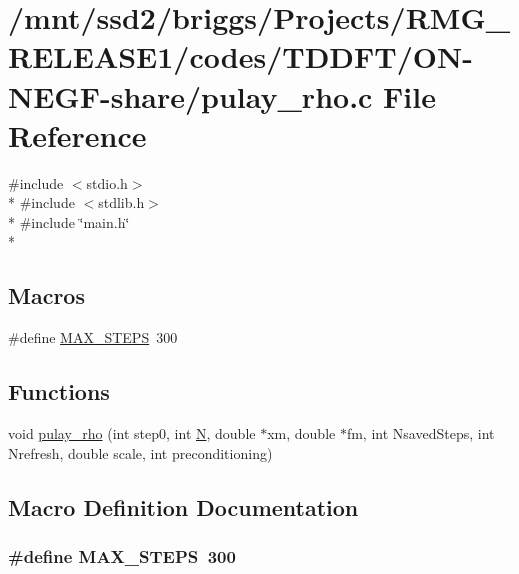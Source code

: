 \hypertarget{_t_d_d_f_t_2_o_n-_n_e_g_f-share_2pulay__rho_8c}{\section{/mnt/ssd2/briggs/\-Projects/\-R\-M\-G\-\_\-\-R\-E\-L\-E\-A\-S\-E1/codes/\-T\-D\-D\-F\-T/\-O\-N-\/\-N\-E\-G\-F-\/share/pulay\-\_\-rho.c File Reference}
\label{_t_d_d_f_t_2_o_n-_n_e_g_f-share_2pulay__rho_8c}
}
{\ttfamily \#include $<$stdio.\-h$>$}\\*
{\ttfamily \#include $<$stdlib.\-h$>$}\\*
{\ttfamily \#include \char`\"{}main.\-h\char`\"{}}\\*
\subsection*{Macros}
\begin{DoxyCompactItemize}
\item 
\#define \hyperlink{_t_d_d_f_t_2_o_n-_n_e_g_f-share_2pulay__rho_8c_aa0414caef00a64a51d4c6c0711d9e70a}{M\-A\-X\-\_\-\-S\-T\-E\-P\-S}~300
\end{DoxyCompactItemize}
\subsection*{Functions}
\begin{DoxyCompactItemize}
\item 
void \hyperlink{_t_d_d_f_t_2_o_n-_n_e_g_f-share_2pulay__rho_8c_abda2928fadc14279495c44f1079baea8}{pulay\-\_\-rho} (int step0, int \hyperlink{lda__c__2d__prm_8c_a67af716b12fead5a86898ad074a0b959}{N}, double $\ast$xm, double $\ast$fm, int Nsaved\-Steps, int Nrefresh, double scale, int preconditioning)
\end{DoxyCompactItemize}


\subsection{Macro Definition Documentation}
\hypertarget{_t_d_d_f_t_2_o_n-_n_e_g_f-share_2pulay__rho_8c_aa0414caef00a64a51d4c6c0711d9e70a}{
\subsubsection[{M\-A\-X\-\_\-\-S\-T\-E\-P\-S}]{\setlength{\rightskip}{0pt plus 5cm}\#define M\-A\-X\-\_\-\-S\-T\-E\-P\-S~300}}\label{_t_d_d_f_t_2_o_n-_n_e_g_f-share_2pulay__rho_8c_aa0414caef00a64a51d4c6c0711d9e70a}



